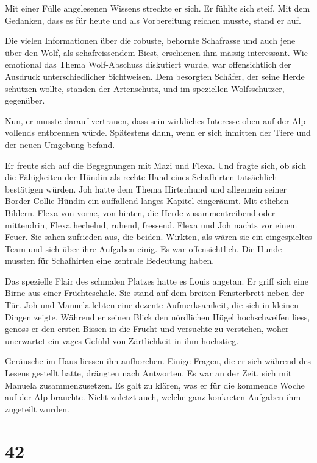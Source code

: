 Mit einer Fülle angelesenen Wissens streckte er sich. Er fühlte sich
steif. Mit dem Gedanken, dass es für heute und als Vorbereitung reichen
musste, stand er auf.

Die vielen Informationen über die robuste, behornte Schafrasse und auch
jene über den Wolf, als schafreissendem Biest, erschienen ihm mässig
interessant. Wie emotional das Thema Wolf-Abschuss diskutiert wurde, war
offensichtlich der Ausdruck unterschiedlicher Sichtweisen. Dem besorgten
Schäfer, der seine Herde schützen wollte, standen der Artenschutz, und
im speziellen Wolfsschützer, gegenüber.

Nun, er musste darauf vertrauen, dass sein wirkliches Interesse oben auf
der Alp vollends entbrennen würde. Spätestens dann, wenn er sich
inmitten der Tiere und der neuen Umgebung befand.

Er freute sich auf die Begegnungen mit Mazi und Flexa. Und fragte sich,
ob sich die Fähigkeiten der Hündin als rechte Hand eines Schafhirten
tatsächlich bestätigen würden. Joh hatte dem Thema Hirtenhund und
allgemein seiner Border-Collie-Hündin ein auffallend langes Kapitel
eingeräumt. Mit etlichen Bildern. Flexa von vorne, von hinten, die Herde
zusammentreibend oder mittendrin, Flexa hechelnd, ruhend, fressend.
Flexa und Joh nachts vor einem Feuer. Sie sahen zufrieden aus, die
beiden. Wirkten, als wären sie ein eingespieltes Team und sich über ihre
Aufgaben einig. Es war offensichtlich. Die Hunde mussten für Schafhirten
eine zentrale Bedeutung haben.

Das spezielle Flair des schmalen Platzes hatte es Louis angetan. Er
griff sich eine Birne aus einer Früchteschale. Sie stand auf dem breiten
Fensterbrett neben der Tür. Joh und Manuela lebten eine dezente
Aufmerksamkeit, die sich in kleinen Dingen zeigte. Während er seinen
Blick den nördlichen Hügel hochschweifen liess, genoss er den ersten
Bissen in die Frucht und versuchte zu verstehen, woher unerwartet ein
vages Gefühl von Zärtlichkeit in ihm hochstieg.

Geräusche im Haus liessen ihn aufhorchen. Einige Fragen, die er sich
während des Lesens gestellt hatte, drängten nach Antworten. Es war an
der Zeit, sich mit Manuela zusammenzusetzen. Es galt zu klären, was er
für die kommende Woche auf der Alp brauchte. Nicht zuletzt auch, welche
ganz konkreten Aufgaben ihm zugeteilt wurden.

\chapter{42}\label{section-41}

